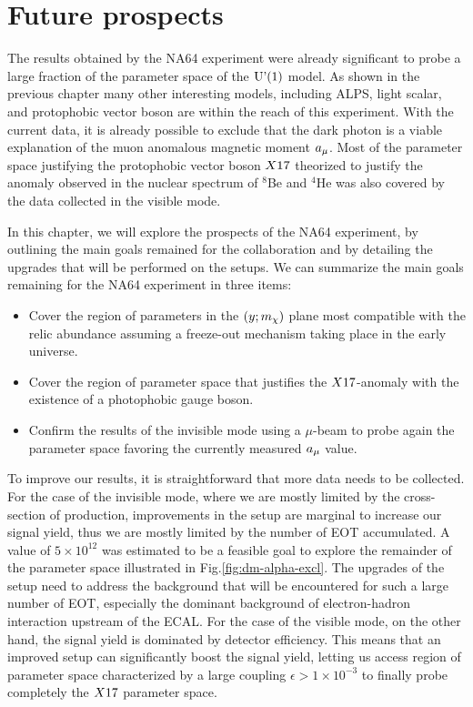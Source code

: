 
\newcommand{\pdirfive}{chapters/plots/chapter5}

\chapter{Future prospects} %
\label{chapter5} %

The results obtained by the NA64 experiment were already significant to probe a large fraction of the parameter space of the $\textrm{U'(1)}$ model. As shown in the previous chapter many other interesting models, including ALPS, light scalar, and protophobic vector boson are within the reach of this experiment. With the current data, it is already possible to exclude that the dark photon is a viable explanation of the muon anomalous magnetic moment $a_{\mu}$. Most of the parameter space justifying the protophobic vector boson $X17$ theorized to justify the anomaly observed in the nuclear spectrum of $^8$Be and $^4$He was also covered by the data collected in the visible mode.

In this chapter, we will explore the prospects of the NA64 experiment, by outlining the main goals remained for the collaboration and by detailing the upgrades that will be performed on the setups. We can summarize the main goals remaining for the NA64 experiment in three items:

\begin{itemize}
\item Cover the region of parameters in the $(y;m_{\chi})$ plane most compatible with the relic abundance assuming a freeze-out mechanism taking place in the early universe.
\item Cover the region of parameter space that justifies the $X17$-anomaly with the existence of a photophobic gauge boson.  
\item Confirm the results of the invisible mode using a $\mu$-beam to probe again the parameter space favoring the currently measured $a_{\mu}$ value.
\end{itemize}

To improve our results, it is straightforward that more data needs to be collected. For the case of the invisible mode, where we are mostly limited by the cross-section of production, improvements in the setup are marginal to increase our signal yield, thus we are mostly limited by the number of EOT accumulated. A value of $5 \times 10^{12}$ was estimated to be a feasible goal to explore the remainder of the parameter space illustrated in Fig.\ref{fig:dm-alpha-excl}. The upgrades of the setup need to address the background that will be encountered for such a large number of EOT, especially the dominant background of electron-hadron interaction upstream of the ECAL.
For the case of the visible mode, on the other hand, the signal yield is dominated by detector efficiency. This means that an improved setup can significantly boost the signal yield, letting us access region of parameter space characterized by a large coupling $\epsilon > 1 \times 10^{-3}$ to finally probe completely the $X17$ parameter space.

